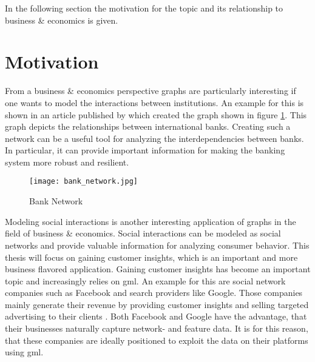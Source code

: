 	\noindent In the following section the motivation for the topic and its
	relationship to business \& economics is given. 

	\section{Motivation}

	\noindent From a business \& economics perspective graphs are particularly
	interesting if one wants to model the interactions between institutions. An 
	example for this is shown in an article published by 
	\cite{schweitzer2009economic} which created the graph shown in figure
	\ref{fig:bank_network}. This graph depicts the relationships between 
	international banks. Creating such a network can be a useful tool for 
	analyzing the interdependencies between banks. In particular, it can 
	provide important information for making the banking system more robust and 
	resilient. 

	\begin{figure}[h]
		\centering
		\texttt{[image: bank\_network.jpg]}
		\caption{Bank Network}
		\cite[p. 424]{schweitzer2009economic}
		\label{fig:bank_network}
	\end{figure} 

	\noindent Modeling social interactions is another interesting application
	of graphs in the field of business \& economics. Social interactions can be
	modeled as social networks and provide valuable information for analyzing
	consumer behavior. This thesis will focus on gaining customer insights,
	which is an important and more business flavored application. Gaining
	customer insights has become an important topic and increasingly relies on
	\acs{gml}. An example for this are social network companies such as 
	Facebook and search providers like Google. Those companies mainly generate 
	their revenue by providing customer insights and selling targeted 
	advertising to their clients \citep{Facebook2021,Alphabet2021}. Both 
	Facebook and Google have the advantage, that their businesses naturally 
	capture network- and feature data. It is for this reason, that these
	companies are ideally positioned to exploit the data on their platforms
	using \acs{gml}. \\

